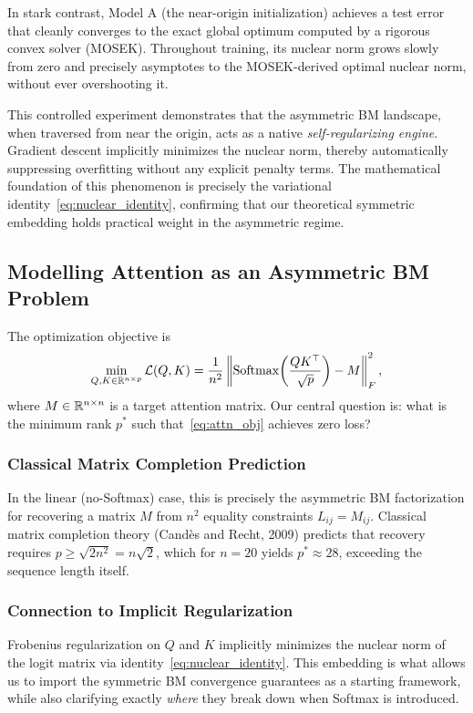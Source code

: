 In stark contrast, Model A (the near-origin initialization) achieves a test error that cleanly converges to the exact global optimum computed by a rigorous convex solver (MOSEK). Throughout training, its nuclear norm grows slowly from zero and precisely asymptotes to the MOSEK-derived optimal nuclear norm, without ever overshooting it.

This controlled experiment demonstrates that the asymmetric BM landscape, when traversed from near the origin, acts as a native \emph{self-regularizing engine}. Gradient descent implicitly minimizes the nuclear norm, thereby automatically suppressing overfitting without any explicit penalty terms. The mathematical foundation of this phenomenon is precisely the variational identity~\eqref{eq:nuclear_identity}, confirming that our theoretical symmetric embedding holds practical weight in the asymmetric regime.



\subsection{Modelling Attention as an Asymmetric BM Problem}

The optimization objective is
\begin{equation}
\begin{aligned}
  \min_{Q,K \in \mathbb{R}^{n \times p}} \mathcal{L}(Q,K)
  = \frac{1}{n^2} \left\lVert\operatorname{Softmax}\!\left(\frac{QK^\top}{\sqrt{p}}\right) - M\right\rVert_F^2,
\end{aligned}
  \label{eq:attn_obj}
\end{equation}
where $M \in \mathbb{R}^{n\times n}$ is a target attention matrix. Our central question is: what
is the minimum rank $p^*$ such that~\eqref{eq:attn_obj} achieves zero loss?

\subsubsection{Classical Matrix Completion Prediction}
In the linear (no-Softmax) case, this
is precisely the asymmetric BM factorization for recovering a matrix $M$ from $n^2$
equality constraints $L_{ij} = M_{ij}$. Classical matrix completion theory (Cand\`{e}s
and Recht, 2009) predicts that recovery requires $p \geq \sqrt{2 n^2} = n\sqrt{2}$, which
for $n = 20$ yields $p^* \approx 28$, exceeding the sequence length itself.

\subsubsection{Connection to Implicit Regularization}
Frobenius regularization on $Q$ and $K$
implicitly minimizes the nuclear norm of the logit matrix via identity~\eqref{eq:nuclear_identity}.
This embedding is what allows us to import the symmetric BM convergence guarantees as a
starting framework, while also clarifying exactly \emph{where} they break down when Softmax
is introduced.

